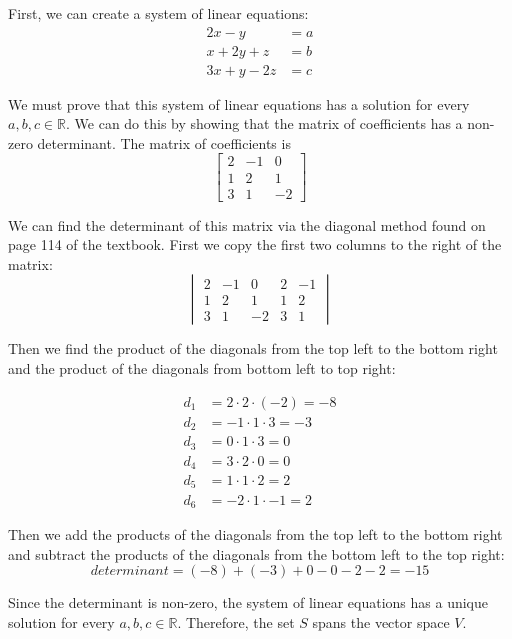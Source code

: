 	First, we can create a system of linear equations:
	\begin{align*}
		2x - y      & = a \\
		x + 2y + z  & = b \\
		3x + y - 2z & = c
	\end{align*}

	We must prove that this system of linear equations has a solution for every $a,b,c\in\mathbb{R}$. We can do this by showing that the matrix of coefficients has a non-zero determinant. The matrix of coefficients is
$$
\begin{bmatrix}
	2 & -1 & 0  \\
	1 & 2  & 1  \\
	3 & 1  & -2
\end{bmatrix}
$$

	We can find the determinant of this matrix via the diagonal method found on page 114 of the textbook. First we copy the first two columns to the right of the matrix:
$$
\begin{vmatrix}
	2 & -1 & 0  & 2 & -1 \\
	1 & 2  & 1  & 1 & 2  \\
	3 & 1  & -2 & 3 & 1
\end{vmatrix}
$$

	Then we find the product of the diagonals from the top left to the bottom right and the product of the diagonals from bottom left to top right:

	\begin{align*}
		d_1 & = 2\cdot2\cdot(-2) = -8 \\
		d_2 & = -1\cdot1\cdot3 = -3   \\
		d_3 & = 0\cdot1\cdot3 = 0     \\
		d_4 & = 3\cdot2\cdot0 = 0     \\
		d_5 & = 1\cdot1\cdot2 = 2     \\
		d_6 & = -2\cdot1\cdot-1 = 2
	\end{align*}

	Then we add the products of the diagonals from the top left to the bottom right and subtract the products of the diagonals from the bottom left to the top right:
$$
determinant = (-8) + (-3) + 0 - 0 - 2 - 2 = -15
$$

Since the determinant is non-zero, the system of linear equations has a unique solution for every $a,b,c\in\mathbb{R}$. Therefore, the set $S$ spans the vector space $V$.

